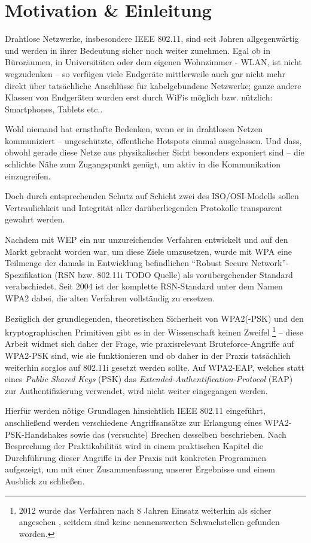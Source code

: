 \section{Motivation \& Einleitung}
Drahtlose Netzwerke, insbesondere IEEE 802.11, sind seit Jahren allgegenwärtig und werden in ihrer Bedeutung sicher noch weiter zunehmen. Egal ob in Büroräumen, in Universitäten oder dem eigenen Wohnzimmer - WLAN, ist nicht wegzudenken -- so verfügen viele Endgeräte mittlerweile auch gar nicht mehr direkt über tatsächliche Anschlüsse für kabelgebundene Netzwerke; ganze andere Klassen von Endgeräten wurden erst durch WiFis möglich bzw. nützlich: Smartphones, Tablets etc..

Wohl niemand hat ernsthafte Bedenken, wenn er in drahtlosen Netzen kommuniziert -- ungeschützte, öffentliche Hotspots einmal ausgelassen. Und dass, obwohl gerade diese Netze aus physikalischer Sicht besonders exponiert sind -- die schlichte Nähe zum Zugangspunkt genügt, um aktiv in die Kommunikation einzugreifen.

Doch durch entsprechenden Schutz auf Schicht zwei des ISO/OSI-Modells sollen Vertraulichkeit und Integrität aller darüberliegenden Protokolle transparent gewahrt werden.

Nachdem mit WEP ein nur unzureichendes Verfahren entwickelt und auf den Markt gebracht worden war, um diese Ziele umzusetzen, wurde mit WPA eine Teilmenge der damals in Entwicklung befindlichen \enquote{Robust Secure Network}-Spezifikation (RSN bzw. 802.11i TODO Quelle) als vorübergehender Standard verabschiedet. Seit 2004 ist der komplette RSN-Standard unter dem Namen WPA2 dabei, die alten Verfahren vollständig zu ersetzen.	

Bezüglich der grundlegenden, theoretischen Sicherheit von WPA2(-PSK) und den kryptographischen Primitiven gibt es in der Wissenschaft keinen Zweifel \footnote{2012 wurde das Verfahren nach 8 Jahren Einsatz weiterhin als sicher angesehen \cite{kumkar2012}, seitdem sind keine nennenswerten Schwachstellen gefunden worden.} -- diese Arbeit widmet sich daher der Frage, wie praxisrelevant Bruteforce-Angriffe auf WPA2-PSK sind, wie sie funktionieren und ob daher in der Praxis tatsächlich weiterhin sorglos auf 802.11i gesetzt werden sollte. Auf WPA2-EAP, welches statt eines \textit{Public Shared Keys} (PSK) das \textit{Extended-Authentification-Protocol} (EAP) zur Authentifizierung verwendet, wird nicht weiter eingegangen werden.

Hierfür werden nötige Grundlagen hinsichtlich IEEE 802.11 eingeführt, anschließend werden verschiedene Angriffsansätze zur Erlangung eines WPA2-PSK-Handshakes sowie das (versuchte) Brechen desselben beschrieben. Nach Besprechung der Praktikabilität wird in einem praktischen Kapitel die Durchführung dieser Angriffe in der Praxis mit konkreten Programmen aufgezeigt, um mit einer Zusammenfassung unserer Ergebnisse und einem Ausblick zu schließen.
